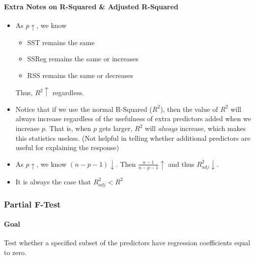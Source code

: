 \documentclass[10pt]{article}
\begin{document}
\paragraph{Extra Notes on R-Squared \& Adjusted R-Squared}
\begin{itemize}
    \item As $p\uparrow$, we know
        \begin{itemize}
            \item SST remains the same
            \item SSReg remains the same or increases
            \item RSS remains the same or decreases
        \end{itemize}
        Thus, $R^2\uparrow$ regardless.
    \item Notice that if we use the normal R-Squared ($R^2$), then the value of $R^2$ will always increase regardless of the usefulness of extra predictors added when we increase $p$. That is, when $p$ gets larger, $R^2$ will \textit{always} increase, which makes this statistics useless. (Not helpful in telling whether additional predictors are useful for explaining the response)
    \item As $p\uparrow$, we know $(n-p-1)\downarrow$. Then $\frac{n-1}{n-p-1}\uparrow$ and thus $R^2_{adj}\downarrow$.
    \item It is always the case that $R^2_{adj} < R^2$
\end{itemize}

\subsubsection{Partial F-Test}
\paragraph{Goal} Test whether a specified subset of the predictors have regression coefficients equal to zero.
\end{document}

